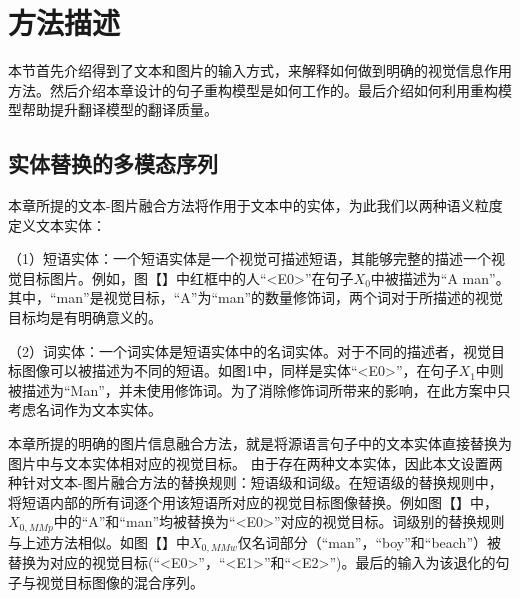 \section{方法描述}

本节首先介绍得到了文本和图片的输入方式，来解释如何做到明确的视觉信息作用方法。然后介绍本章设计的句子重构模型是如何工作的。最后介绍如何利用重构模型帮助提升翻译模型的翻译质量。

\subsection{实体替换的多模态序列}
\label{sec:3_entity_replacement}
本章所提的文本-图片融合方法将作用于文本中的实体，为此我们以两种语义粒度定义文本实体：

（1）{\sffamily 短语实体：}一个短语实体是一个视觉可描述短语，其能够完整的描述一个视觉目标图片。例如，图【】中红框中的人“<E0>”在句子$X_0$中被描述为“A man”。其中，“man”是视觉目标，“A”为“man”的数量修饰词，两个词对于所描述的视觉目标均是有明确意义的。

（2）{\sffamily 词实体：}一个词实体是短语实体中的名词实体。对于不同的描述者，视觉目标图像可以被描述为不同的短语。如图1中，同样是实体“<E0>”，在句子$X_1$中则被描述为“Man”，并未使用修饰词。为了消除修饰词所带来的影响，在此方案中只考虑名词作为文本实体。

本章所提的明确的图片信息融合方法，就是将源语言句子中的文本实体直接替换为图片中与文本实体相对应的视觉目标。
由于存在两种文本实体，因此本文设置两种针对文本-图片融合方法的替换规则：短语级和词级。在短语级的替换规则中，将短语内部的所有词逐个用该短语所对应的视觉目标图像替换。例如图【】中，$X_{0,MMp}$中的“A”和“man”均被替换为“<E0>”对应的视觉目标。词级别的替换规则与上述方法相似。如图【】中$X_{0,MMw}$仅名词部分（“man”，“boy”和“beach”）被替换为对应的视觉目标(“<E0>”，“<E1>”和“<E2>”)。最后的输入为该退化的句子与视觉目标图像的混合序列。

